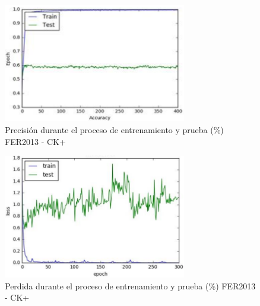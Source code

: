 \begin{figure}[H]
		\centering
		\includegraphics[width=80mm]{Imagenes/precision_fer_ck+.png}
		\caption{Precisión durante el proceso de entrenamiento y prueba (\%) FER2013 - CK+}
		\label{fig:precision_fer_ck+}
\end{figure}

\begin{figure}[H]
		\centering
		\includegraphics[width=80mm]{Imagenes/perdida_fer_ck+.png}
		\caption{Perdida durante el proceso de entrenamiento y prueba (\%) FER2013 - CK+}
		\label{fig:perdida_fer_ck+}
\end{figure}


